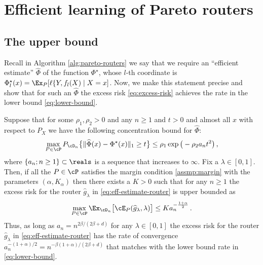 \section{Efficient learning of Pareto routers} 
\label{sec:efficient-learning-algorithm}


\subsection{The upper bound}\label{sec:upper-bound}

Recall in Algorithm \ref{alg:pareto-routers} we say that we require an ``efficient estimate'' $\widehat \Phi$ of the function $\Phi^\star$, whose $l$-th coordinate is $\Phi^\star_l(x) = \Ex_P[\ell\{Y, f_l(X)\mid X = x]$. Now, we make this statement precise and show that for such an $\widehat \Phi $ the excess risk \eqref{eq:excess-risk} achieves the rate in the lower bound \eqref{eq:lower-bound}. 

\begin{theorem}\label{thm:upper-bound}
    Suppose that for some $\rho_1, \rho_2 > 0$ and any $n \ge 1$ and $t > 0$ and almost all $x$ with respect to $P_X$ we have the following concentration bound for $\widehat \Phi$:
    \begin{equation}\label{eq:concentration-phi}
        \max_{P\in \cP} P_{\cD_n} \big \{ \|\widehat \Phi(x) - \Phi^\star (x)\|_1 \ge t\big \} \le  \rho_1 \exp\big (- \rho_2 a_n t^2 \big )\,, 
    \end{equation}
    where $\{a_n; n \ge 1\}\subset \reals$ is a sequence that increases to $\infty$.  
    Fix a $\lambda \in [0, 1]$.  Then, if all the $P\in \cP$ satisfies the margin condition \ref{assmp:margin} with the parameters $(\alpha, K_\alpha)$ then there exists a $K> 0$ such that for any $n \ge 1$ the excess risk for the router $\widehat g_\lambda$ in \eqref{eq:eff-estimate-router} is upper bounded as 
    \begin{equation}
        \max_{P\in \cP} \Ex_{\cD_n}\big [\cE_P(\widehat g_\lambda,\lambda)\big ] \le K a_n^{-\frac{1+ \alpha}{2}}\,. 
    \end{equation}
    Thus, as long as $a_n = n^{{  2\beta/(2\beta + d)}}$  for any $\lambda \in [0, 1]$ the excess risk for the router $\widehat g_\lambda$ in \eqref{eq:eff-estimate-router} has the rate of convergence $a_n^{- {(1 + \alpha)}/{2}} = n^{- {\beta(1 + \alpha)}/{(2\beta + d)}}$ that matches with the lower bound rate in \eqref{eq:lower-bound}. 
\end{theorem}




